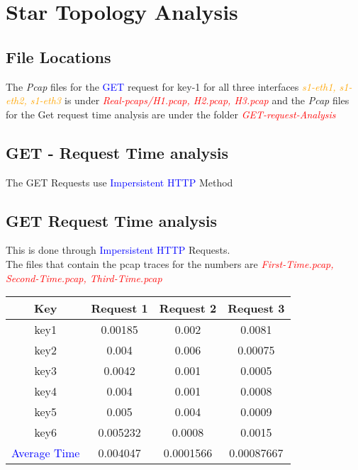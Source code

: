 \section{Star Topology Analysis }


\subsection{File Locations}
The \textit{Pcap} files for the \textcolor{blue}{GET} request for key-1 for all three interfaces \textit{\textcolor{orange}{s1-eth1, s1-eth2, s1-eth3 }}is under \textit{\textcolor{red}{Real-pcaps/H1.pcap, H2.pcap, H3.pcap}}
and the \textit{Pcap} files for the Get request time analysis are under the folder \textit{\textcolor{red}{GET-request-Analysis}}
\subsection{GET - Request Time analysis}
The GET Requests use \textcolor{blue}{Impersistent HTTP} Method

\subsection{GET Request Time analysis}
    This is done through \textcolor{blue}{Impersistent HTTP} Requests. \\ The files that contain the pcap traces for the numbers 
    are \textit{\textcolor{red}{First-Time.pcap, Second-Time.pcap, Third-Time.pcap}}
\begin{center}

\begin{tabular}{c |c |c |c }
    Key & Request 1 & Request 2 & Request 3 \\
    \hline
    key1 & 0.00185 & 0.002 & 0.0081 \\
    \hline
    key2 & 0.004 &0.006  & 0.00075 \\
    \hline
    key3 & 0.0042 & 0.001 & 0.0005 \\
    \hline

    key4 & 0.004& 0.001 & 0.0008 \\
    \hline

    key5 & 0.005& 0.004 & 0.0009 \\
    \hline 
    key6 & 0.005232 & 0.0008 & 0.0015 \\
    \hline
    \textcolor{blue}{Average Time} & 0.004047 & 0.0001566 & 0.00087667 \\
    \hline
\end{tabular}
\end{center}
